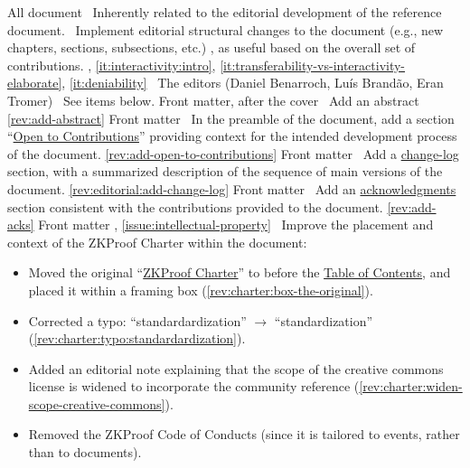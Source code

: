 All document
\newcol \ccontext\ Inherently related to the editorial development of the reference document. 
				\propContrib\ Implement editorial structural changes to the document (e.g., new chapters, 
				sections, subsections, etc.) , as useful based on the overall set of contributions.
\newcol {}, \ref{it:interactivity:intro}, \ref{it:transferability-vs-interactivity-elaborate}, \ref{it:deniability}
\newcol \contributors\ The editors (Daniel Benarroch, Luís Brandão, Eran Tromer)
				\Chan\ See items below.
\newcol 
\rowendL
Front matter, after the cover
\newcol 
\newcol {}
\newcol \Chan\ Add an abstract
\newcol \ref{rev:add-abstract}
\rowendL
Front matter
\newcol 
\newcol {}
\newcol \Chan\ In the preamble of the document, add a section ``\hyperref[sec:prelim:open-to-contributions]{Open to Contributions}'' providing context for the intended development process of the document.
\newcol \ref{rev:add-open-to-contributions}
\rowendL
Front matter
\newcol 
\newcol {}
\newcol \Chan\ Add a \hyperref[sec:prelim:change-log]{change-log} section, with a summarized description of the sequence of main versions of the document.
\newcol \ref{rev:editorial:add-change-log}
\rowendL
Front matter
\newcol 
\newcol {}
\newcol \Chan\ Add an \hyperref[sec:prelim:acknowledgments]{acknowledgments} section consistent with the contributions provided to the document.
\newcol \ref{rev:add-acks}
\rowendL
Front matter
\newcol 
\newcol {}, \ref{issue:intellectual-property}
\newcol \Chan\ Improve the placement and context of the ZKProof Charter within the document:
				\begin{itemize}
				\item Moved the original ``\hyperref[sec:prelim:charter]{ZKProof Charter}'' to before the \hyperref[prelim:contents]{Table of Contents}, and placed it within a framing box (\ref{rev:charter:box-the-original}).
				\item Corrected a typo: ``standardardization'' $\rightarrow$ ``standardization'' (\ref{rev:charter:typo:standardardization}).
				\item Added an editorial note explaining that the scope of the creative commons license is widened to incorporate the community reference (\ref{rev:charter:widen-scope-creative-commons}).
				\item Removed the ZKProof Code of Conducts (since it is tailored to events, rather than to documents).
				\end{itemize}
